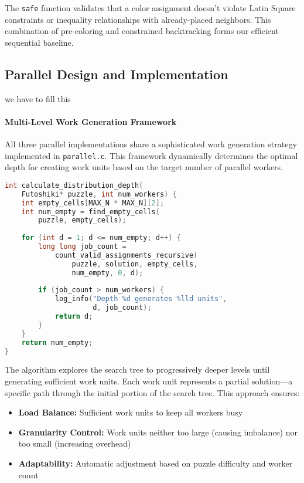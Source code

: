 The \texttt{safe} function validates that a color assignment doesn't violate Latin Square constraints or inequality relationships with already-placed neighbors. This combination of pre-coloring and constrained backtracking forms our efficient sequential baseline.

\subsection{Parallel Design and Implementation}
\label{subsec:parallel_implementation}
we have to fill this

\paragraph{Multi-Level Work Generation Framework}
\label{par:dynamic_load_balancing}
All three parallel implementations share a sophisticated work generation strategy implemented in \texttt{parallel.c}. This framework dynamically determines the optimal depth for creating work units based on the target number of parallel workers.

\begin{lstlisting}[language=C, caption=Dynamic depth calculation]
int calculate_distribution_depth(
    Futoshiki* puzzle, int num_workers) {
    int empty_cells[MAX_N * MAX_N][2];
    int num_empty = find_empty_cells(
        puzzle, empty_cells);
    
    for (int d = 1; d <= num_empty; d++) {
        long long job_count = 
            count_valid_assignments_recursive(
                puzzle, solution, empty_cells, 
                num_empty, 0, d);
        
        if (job_count > num_workers) {
            log_info("Depth %d generates %lld units", 
                     d, job_count);
            return d;
        }
    }
    return num_empty;
}
\end{lstlisting}

The algorithm explores the search tree to progressively deeper levels until generating sufficient work units. Each work unit represents a partial solution—a specific path through the initial portion of the search tree. This approach ensures:
\begin{itemize}
    \item \textbf{Load Balance:} Sufficient work units to keep all workers busy
    \item \textbf{Granularity Control:} Work units neither too large (causing imbalance) nor too small (increasing overhead)
    \item \textbf{Adaptability:} Automatic adjustment based on puzzle difficulty and worker count
\end{itemize}

